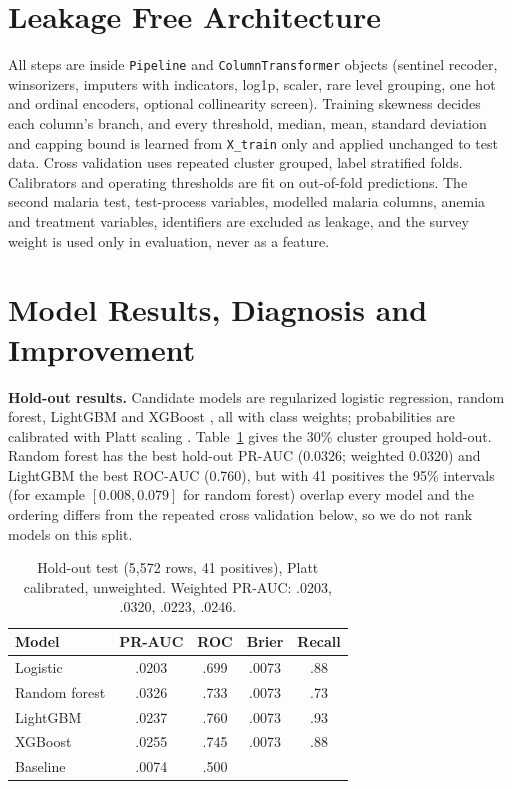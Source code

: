 \documentclass[11pt]{article}
\begin{document}
\section{Leakage Free Architecture}
All steps are inside \texttt{Pipeline} and \texttt{ColumnTransformer} objects (sentinel recoder, winsorizers, imputers with indicators, log1p, scaler, rare level grouping, one hot and ordinal encoders, optional collinearity screen). Training skewness decides each column's branch, and every threshold, median, mean, standard deviation and capping bound is learned from \texttt{X\_train} only and applied unchanged to test data. Cross validation uses repeated cluster grouped, label stratified folds. Calibrators and operating thresholds are fit on out-of-fold predictions. The second malaria test, test-process variables, modelled malaria columns, anemia and treatment variables, identifiers are excluded as leakage, and the survey weight is used only in evaluation, never as a feature.

\section{Model Results, Diagnosis and Improvement}
\label{sec:res}
\textbf{Hold-out results.} Candidate models are regularized logistic regression, random forest, LightGBM \cite{ke2017} and XGBoost \cite{chen2016}, all with class weights; probabilities are calibrated with Platt scaling \cite{platt1999}. Table~\ref{tab:res} gives the 30\% cluster grouped hold-out. Random forest has the best hold-out PR-AUC (0.0326; weighted 0.0320) and LightGBM the best ROC-AUC (0.760), but with 41 positives the 95\% intervals (for example $[0.008, 0.079]$ for random forest) overlap every model and the ordering differs from the repeated cross validation below, so we do not rank models on this split.

\begin{table}[t]
\centering\small
\begin{tabular}{lcccc}
\toprule
Model & PR-AUC & ROC & Brier & Recall\\
\midrule
Logistic & .0203 & .699 & .0073 & .88\\
Random forest & .0326 & .733 & .0073 & .73\\
LightGBM & .0237 & .760 & .0073 & .93\\
XGBoost & .0255 & .745 & .0073 & .88\\
\midrule
Baseline & .0074 & .500 & & \\
\bottomrule
\end{tabular}
\caption{Hold-out test (5{,}572 rows, 41 positives), Platt calibrated, unweighted. Weighted PR-AUC: .0203, .0320, .0223, .0246.}
\label{tab:res}
\end{table}
\end{document}
